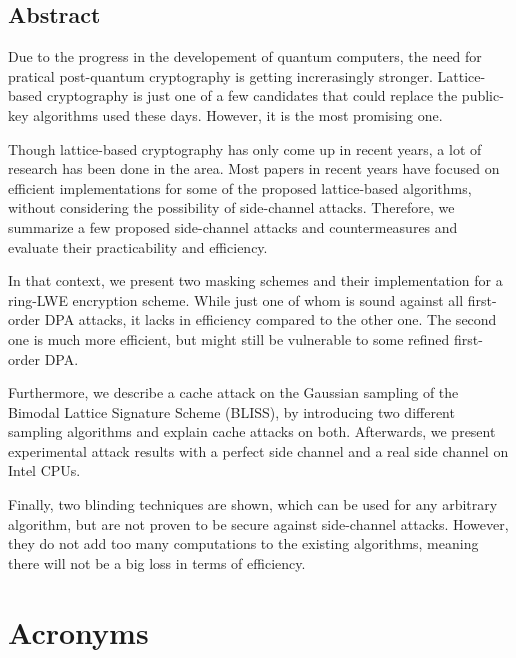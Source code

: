 \documentclass[a4paper,12pt,twoside,openany,headsepline,bibliography=totocnumbered]{scrbook}
\begin{document}


\section*{Abstract}
Due to the progress in the developement of quantum computers, the need for pratical post-quantum cryptography is getting increrasingly stronger. Lattice-based cryptography is just one of a few candidates that could replace the public-key algorithms used these days. However, it is the most promising one.

Though lattice-based cryptography has only come up in recent years, a lot of research has been done in the area. Most papers in recent years have focused on efficient implementations for some of the proposed lattice-based algorithms, without considering the possibility of side-channel attacks. Therefore, we summarize a few proposed side-channel attacks and  countermeasures and evaluate their practicability and efficiency.

In that context, we present two masking schemes and their implementation for a ring-LWE encryption scheme. While just one of whom is sound against all first-order DPA attacks, it lacks in efficiency compared to the other one. The second one is much more efficient, but might still be vulnerable to some refined first-order DPA.

Furthermore, we describe a cache attack on the Gaussian sampling of the Bimodal Lattice Signature Scheme (BLISS), by introducing two different sampling algorithms and explain cache attacks on both. Afterwards, we present experimental attack results with a perfect side channel and a real side channel on Intel CPUs.

Finally, two blinding techniques are shown, which can be used for any arbitrary algorithm, but are not proven to be secure against side-channel attacks. However, they do not add too many computations to the existing algorithms, meaning there will not be a big loss in terms of efficiency.
\clearpage

\tableofcontents
\mainmatter

\chapter*{Acronyms}
\begin{acronym}
 	\setlength{\itemsep}{0.2em} 
\end{acronym}
\end{document}
